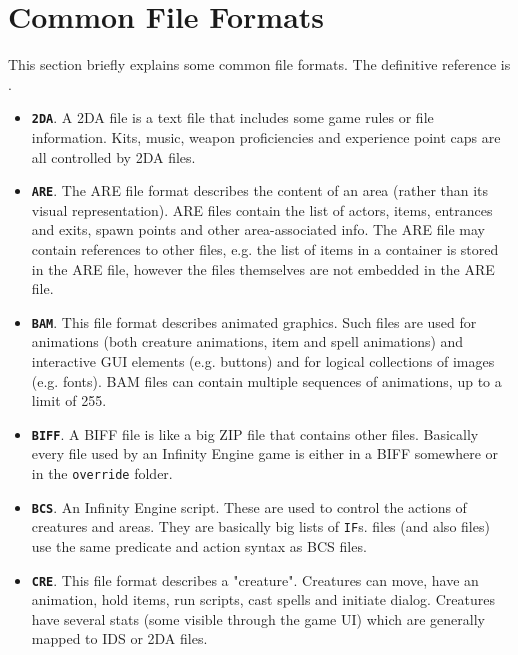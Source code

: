 \documentclass{article}
\def\ttref#1{\ahrefloc{#1}{\tt #1}}
\def\DEFINE#1{{\tt \bf #1}\label{#1}\index{#1}}
\def\t#1{{\tt #1}}
\begin{document}
\section{Common File Formats}

This section briefly explains some common file formats. The definitive
reference is
.

\begin{itemize}

\item \DEFINE{2DA}. A 2DA file is a text file that includes some game rules
or file information. Kits, music, weapon proficiencies and experience point
caps are all controlled by 2DA files.

\item \DEFINE{ARE}. The ARE file format describes the content of an area
(rather than its visual representation). ARE files contain the list of actors,
items, entrances and exits, spawn points and other area-associated info.
The ARE file may contain references to other files, e.g. the list of items
in a container is stored in the ARE file, however the files themselves are
not embedded in the ARE file.

\item \DEFINE{BAM}. This file format describes animated graphics. Such files
are used for animations (both creature animations, item and spell animations)
and interactive GUI elements (e.g. buttons) and for logical collections of
images (e.g. fonts). BAM files can contain multiple sequences of animations,
up to a limit of 255.

\item \DEFINE{BIFF}. A BIFF file is like a big ZIP file that contains other
files. Basically every file used by an Infinity Engine game is either in a
BIFF somewhere or in the \t{override} folder.

\item \DEFINE{BCS}. An Infinity Engine script. These are used to control
the actions of creatures and areas. They are basically big lists of
\t{IF}s. \ttref{D} files (and also \ttref{DLG} files) use the same
predicate and action syntax as BCS files.

\item \DEFINE{CRE}. This file format describes a "creature". Creatures can
move, have an animation, hold items, run scripts, cast spells and initiate
dialog. Creatures have several stats (some visible through the game UI) which
are generally mapped to IDS or 2DA files.


\end{itemize}
\end{document}
